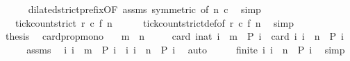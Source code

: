 \begin{isabellebody}
\ \ \ \ \isamarkupfalse%
\ dilated{\isacharunderscore}strict{\isacharunderscore}prefix{\isacharbrackleft}OF\ assms{\isacharcomma}\ symmetric{\isacharcomma}\ of\ {\isacartoucheopen}n{\isacartoucheclose}\ {\isacartoucheopen}c{\isacartoucheclose}{\isacharbrackright}\ \isamarkupfalse%
\ simp\isanewline
\ \ \isamarkupfalse%
\ \isamarkupfalse%
\ {\isacartoucheopen}{\isachardot}{\isachardot}{\isachardot}\ {\isacharequal}\ tick{\isacharunderscore}count{\isacharunderscore}strict\ r\ c\ {\isacharparenleft}f\ n{\isacharparenright}{\isacartoucheclose}\isanewline
\ \ \ \ \isamarkupfalse%
\ tick{\isacharunderscore}count{\isacharunderscore}strict{\isacharunderscore}def{\isacharbrackleft}of\ {\isacartoucheopen}r{\isacartoucheclose}\ {\isacartoucheopen}c{\isacartoucheclose}\ {\isacartoucheopen}f\ n{\isacartoucheclose}{\isacharbrackright}\ \isamarkupfalse%
\ simp\isanewline
\ \ \isamarkupfalse%
\ \isamarkupfalse%
\ {\isacharquery}thesis\ \isacommand{{\isachardot}}\isamarkupfalse%
\isanewline
{}\isamarkupfalse%
%
\endisatagproof
{\isafoldproof}%
%
\isadelimproof
\isanewline
%
\endisadelimproof
\isanewline
{}\isamarkupfalse%
\ card{\isacharunderscore}prop{\isacharunderscore}mono{\isacharcolon}\isanewline
\ \ \ {\isacartoucheopen}m\ {\isasymle}\ n{\isacartoucheclose}\isanewline
\ \ \ \ \ {\isacartoucheopen}card\ {\isacharbraceleft}i{\isacharcolon}{\isacharcolon}nat{\isachardot}\ i\ {\isasymle}\ m\ {\isasymand}\ P\ i{\isacharbraceright}\ {\isasymle}\ card\ {\isacharbraceleft}i{\isachardot}\ i\ {\isasymle}\ n\ {\isasymand}\ P\ i{\isacharbraceright}{\isacartoucheclose}\isanewline
%
\isadelimproof
%
\endisadelimproof
%
\isatagproof
{}\isamarkupfalse%
\ {\isacharminus}\isanewline
\ \ \isamarkupfalse%
\ assms\ \isamarkupfalse%
\ {\isacartoucheopen}{\isacharbraceleft}i{\isachardot}\ i\ {\isasymle}\ m\ {\isasymand}\ P\ i{\isacharbraceright}\ {\isasymsubseteq}\ {\isacharbraceleft}i{\isachardot}\ i\ {\isasymle}\ n\ {\isasymand}\ P\ i{\isacharbraceright}{\isacartoucheclose}\ \isamarkupfalse%
\ auto\isanewline
\ \ \isamarkupfalse%
\ \isamarkupfalse%
\ {\isacartoucheopen}finite\ {\isacharbraceleft}i{\isachardot}\ i\ {\isasymle}\ n\ {\isasymand}\ P\ i{\isacharbraceright}{\isacartoucheclose}\ \isamarkupfalse%
\ simp\isanewline
\ \ \isamarkupfalse%
\ \isamarkupfalse%

\end{isabellebody}

